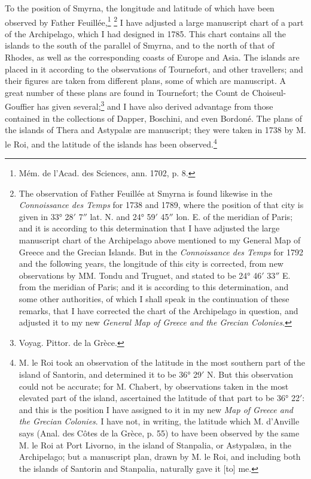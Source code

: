 \documentclass[a4paper, 11pt, oneside, polutonikogreek, english]{article}
\begin{document}
To the position of Smyrna, the longitude and latitude of which have been observed by Father Feuillée,\footnote{Mém. de l'Acad. des Sciences, ann. 1702, p. 8.} \footnote{The observation of Father Feuillée at Smyrna is found likewise in the \emph{Connoissance des Temps} for 1738 and 1789, where the position of that city is given in 33° 28$'$ 7$''$ lat. N. and 24° 59$'$ 45$''$ lon. E. of the meridian of Paris; and it is according to this determination that I have adjusted the large manuscript chart of the Archipelago above mentioned to my General Map of Greece and the Grecian Islands. But in the \emph{Connoissance des Temps} for 1792 and the following years, the longitude of this city is corrected, from new observations by MM. Tondu and Truguet, and stated to be 24° 46$'$ 33$''$ E. from the meridian of Paris; and it is according to this determination, and some other authorities, of which I shall speak in the continuation of these remarks, that I have corrected the chart of the Archipelago in question, and adjusted it to my new \emph{General Map of Greece and the Grecian Colonies}.} I have adjusted a large manuscript chart of a part of the Archipelago, which I had designed in 1785. This chart contains all the islands to the south of the parallel of Smyrna, and to the north of that of Rhodes, as well as the corresponding coasts of Europe and Asia. The islands are placed in it according to the observations of Tournefort, and other travellers; and their figures are taken from different plans, some of which are manuscript. A great number of these plans are found in Tournefort; the Count de Choiseul-Gouffier has given several;\footnote{Voyag. Pittor. de la Grèce.} and I have also derived advantage from those contained in the collections of Dapper, Boschini, and even Bordoné. The plans of the islands of Thera and Astypalæ are manuscript; they were taken in 1738 by M. le Roi, and the latitude of the islands has been observed.\footnote{M. le Roi took an observation of the latitude in the most southern part of the island of Santorin, and determined it to be 36° 29$'$ N. But this observation could not be accurate; for M. Chabert, by observations taken in the most elevated part of the island, ascertained the latitude of that part to be 36° 22$'$: and this is the position I have assigned to it in my new \emph{Map of Greece and the Grecian Colonies}. I have not, in writing, the latitude which M. d'Anville says (Anal. des Côtes de la Grèce, p. 55) to have been observed by the same M. le Roi at Port Livorno, in the island of Stanpalia, or Astypalæa, in the Archipelago; but a manuscript plan, drawn by M. le Roi, and including both the islands of Santorin and Stanpalia, naturally gave it [to] me.}
\end{document}
